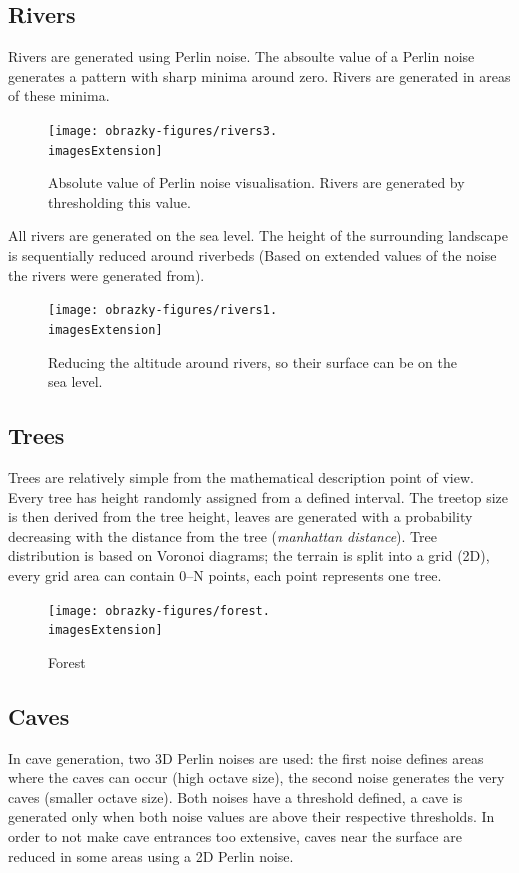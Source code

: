 \pagebreak
\subsection{Rivers}
Rivers are generated using Perlin noise. The absoulte value of a Perlin noise generates a pattern with sharp minima around zero. Rivers are generated in areas of these minima.

\begin{figure}[H]
	\texttt{[image: obrazky-figures/rivers3.\\imagesExtension]}
	\caption{Absolute value of Perlin noise visualisation. Rivers are generated by thresholding this value.}
\end{figure}

\vfill

All rivers are generated on the sea level. The height of the surrounding landscape is sequentially reduced around riverbeds (Based on extended values of the noise the rivers were generated from).

\begin{figure}[H]
	\texttt{[image: obrazky-figures/rivers1.\\imagesExtension]}
	\caption{Reducing the altitude around rivers, so their surface can be on the sea level.}
\end{figure}

\subsection{Trees}
Trees are relatively simple from the mathematical description point of view. Every tree has height randomly assigned from a defined interval. The treetop size is then derived from the tree height, leaves are generated with a probability decreasing with the distance from the tree (\textit{manhattan distance}). Tree distribution is based on Voronoi diagrams; the terrain is split into a grid (2D), every grid area can contain 0–N points, each point represents one tree.

\begin{figure}[H]
	\texttt{[image: obrazky-figures/forest.\\imagesExtension]}
	\caption{Forest}
\end{figure}

\subsection{Caves}
In cave generation, two 3D Perlin noises are used: the first noise defines areas where the caves can occur (high octave size), the second noise generates the very caves (smaller octave size). Both noises have a threshold defined, a cave is generated only when both noise values are above their respective thresholds. In order to not make cave entrances too extensive, caves near the surface are reduced in some areas using a 2D Perlin noise.

